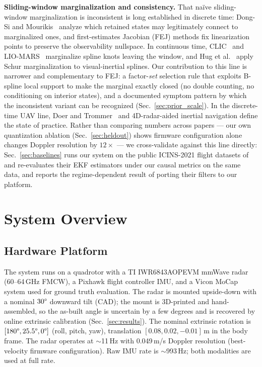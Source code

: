 \documentclass[journal]{IEEEtran}
\begin{document}
\textbf{Sliding-window marginalization and consistency.}
That na\"ive sliding-window marginalization is inconsistent is long
established in discrete time: Dong-Si and
Mourikis~\cite{dongsi2012consistency} analyze which retained states
may legitimately connect to marginalized ones, and first-estimates
Jacobian (FEJ) methods fix linearization points to preserve the
observability nullspace.  In continuous time,
CLIC~\cite{lv2023clic} and
LIO-MARS~\cite{quenzel2025liomars} marginalize spline knots leaving
the window, and Hug et al.~\cite{hug2022continuous} apply Schur
marginalization to visual-inertial splines.  Our contribution to this
line is narrower and complementary to FEJ: a factor-\emph{set}
selection rule that exploits B-spline local support to make the
marginal exactly closed (no double counting, no conditioning on
interior states), and a documented symptom pattern by which the
inconsistent variant can be recognized (Sec.~\ref{sec:prior_scale}).
In the discrete-time UAV line, Doer and
Trommer~\cite{doer2020ekf} and 4D-radar-aided inertial
navigation define the state of practice.
Rather than comparing numbers across papers --- our own quantization
ablation (Sec.~\ref{sec:heldout}) shows firmware configuration alone
changes Doppler resolution by $12\times$ --- we cross-validate against
this line directly: Sec.~\ref{sec:baselines} runs our system on the
public ICINS-2021 flight datasets of~\cite{doer2021yrio} and re-evaluates
their EKF estimators under our causal metrics on the same data, and
reports the regime-dependent result of porting their filters to our
platform.

\section{System Overview}
\label{sec:overview}

\subsection{Hardware Platform}
The system runs on a quadrotor with a TI IWR6843AOPEVM
mmWave radar (60--64\,GHz FMCW), a Pixhawk flight
controller IMU, and a Vicon MoCap system used for ground
truth evaluation.  The radar is mounted upside-down with a nominal
$30\degree$ downward tilt (CAD); the mount is 3D-printed and
hand-assembled, so the as-built angle is uncertain by a few degrees and
is recovered by online extrinsic calibration (Sec.~\ref{sec:results}).
The nominal extrinsic rotation is $[180\degree, 25.5\degree, 0\degree]$
(roll, pitch, yaw), translation $[0.08, 0.02, -0.01]$\,m in the body
frame.  The radar operates at $\sim$11\,Hz with 0.049\,m/s Doppler
resolution (best-velocity firmware configuration).  Raw IMU rate
is $\sim$993\,Hz; both modalities are used at full rate.
\end{document}
